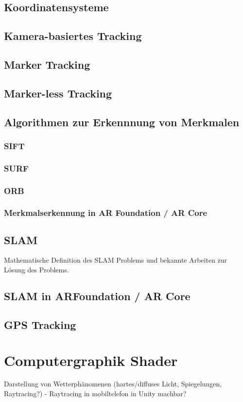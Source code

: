 \subsection{Koordinatensysteme}
\subsection{Kamera-basiertes Tracking}
\subsection{Marker Tracking}
\subsection{Marker-less Tracking}
\subsection{Algorithmen zur Erkennnung von Merkmalen}
\subsubsection{SIFT}
\subsubsection{SURF}
\subsubsection{ORB}
\subsubsection{Merkmalserkennung in AR Foundation / AR Core}
\subsection{SLAM}
Mathematische Definition des SLAM Problems und bekannte Arbeiten zur Lösung des Problems.
\subsection{SLAM in ARFoundation / AR Core}
\subsection{GPS Tracking}


\section{Computergraphik Shader}
Darstellung von Wetterphänomenen (hartes/diffuses Licht, Spiegelungen, Raytracing?)
- Raytracing in mobiltelefon in Unity machbar?
